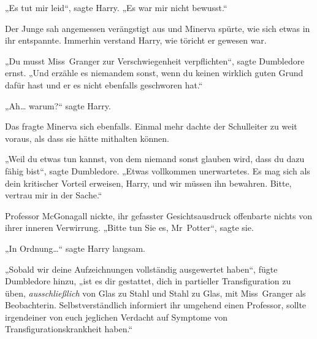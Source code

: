 „Es tut mir leid“, sagte Harry. „Es war mir nicht bewusst.“

Der Junge sah angemessen verängstigt aus und Minerva spürte, wie sich etwas in ihr entspannte. Immerhin verstand Harry, wie töricht er gewesen war.

„Du musst Miss~Granger zur Verschwiegenheit verpflichten“, sagte Dumbledore ernst. „Und erzähle es niemandem sonst, wenn du keinen wirklich guten Grund dafür hast und er es nicht ebenfalls geschworen hat.“

„Ah… warum?“ sagte Harry.

Das fragte Minerva sich ebenfalls. Einmal mehr dachte der Schulleiter zu weit voraus, als dass sie hätte mithalten können.

„Weil du etwas tun kannst, von dem niemand sonst glauben wird, dass du dazu fähig bist“, sagte Dumbledore. „Etwas vollkommen unerwartetes. Es mag sich als dein kritischer Vorteil erweisen, Harry, und wir müssen ihn bewahren. Bitte, vertrau mir in der Sache.“

Professor McGonagall nickte, ihr gefasster Gesichtsausdruck offenbarte nichts von ihrer inneren Verwirrung. „Bitte tun Sie es, Mr~Potter“, sagte sie.

„In Ordnung…“ sagte Harry langsam.

„Sobald wir deine Aufzeichnungen vollständig ausgewertet haben“, fügte Dumbledore hinzu, „ist es dir gestattet, dich in partieller Transfiguration zu üben, \emph{ausschließlich} von Glas zu Stahl und Stahl zu Glas, mit Miss~Granger als Beobachterin. Selbstverständlich informiert ihr umgehend einen Professor, sollte irgendeiner von euch jeglichen Verdacht auf Symptome von Transfigurationskrankheit haben.“

